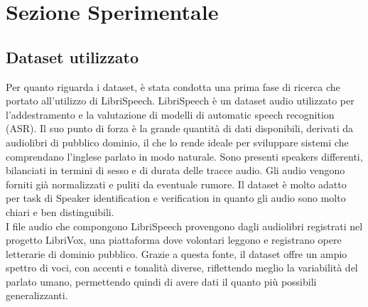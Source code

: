 \chapter{Sezione Sperimentale}
\label{ch:esperimenti}

\section{Dataset utilizzato}
Per quanto riguarda i dataset, è stata condotta una prima fase di ricerca che portato all'utilizzo di LibriSpeech.
LibriSpeech è un dataset audio utilizzato per l’addestramento e la valutazione di modelli di automatic speech recognition (ASR). Il suo punto di forza è la grande quantità di dati disponibili, derivati da audiolibri di pubblico dominio, 
il che lo rende ideale per sviluppare sistemi che comprendano l’inglese parlato in modo naturale. Sono presenti speakers differenti,
bilanciati in termini di sesso e di durata delle tracce audio. Gli audio vengono forniti già normalizzati e puliti da eventuale rumore.
Il dataset è molto adatto per task di Speaker identification e verification in quanto gli audio sono molto chiari e ben distinguibili. \\
I file audio che compongono LibriSpeech provengono dagli audiolibri registrati nel progetto LibriVox, una piattaforma dove volontari 
leggono e registrano opere letterarie di dominio pubblico. Grazie a questa fonte, il dataset offre un ampio spettro di voci, con 
accenti e tonalità diverse, riflettendo meglio la variabilità del parlato umano, permettendo quindi di avere dati il quanto più
possibili generalizzanti.

